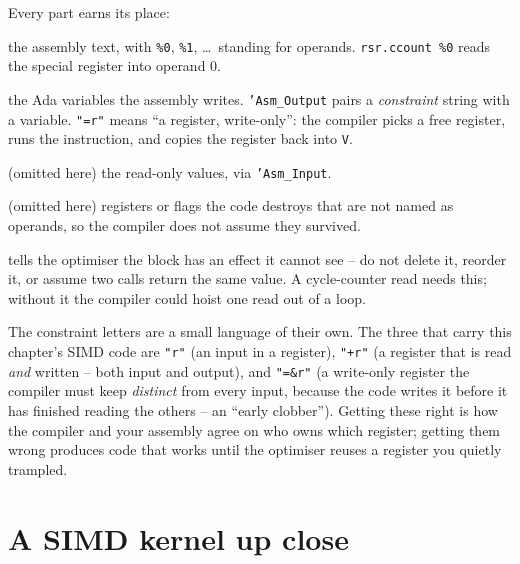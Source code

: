 Every part earns its place:

\begin{description}[style=nextline]
\item[Template] the assembly text, with \texttt{\%0}, \texttt{\%1}, \ldots\ standing
  for operands. \texttt{rsr.ccount \%0} reads the special register into operand 0.
\item[Outputs] the Ada variables the assembly writes. \texttt{'Asm\_Output} pairs a
  \emph{constraint} string with a variable. \texttt{"=r"} means ``a register,
  write-only'': the compiler picks a free register, runs the instruction, and copies
  the register back into \texttt{V}.
\item[Inputs] (omitted here) the read-only values, via \texttt{'Asm\_Input}.
\item[Clobber] (omitted here) registers or flags the code destroys that are not
  named as operands, so the compiler does not assume they survived.
\item[Volatile] tells the optimiser the block has an effect it cannot see -- do not
  delete it, reorder it, or assume two calls return the same value. A cycle-counter
  read needs this; without it the compiler could hoist one read out of a loop.
\end{description}

The constraint letters are a small language of their own. The three that carry this
chapter's SIMD code are \texttt{"r"} (an input in a register), \texttt{"+r"} (a
register that is read \emph{and} written -- both input and output), and
\texttt{"=\&r"} (a write-only register the compiler must keep \emph{distinct} from
every input, because the code writes it before it has finished reading the others --
an ``early clobber''). Getting these right is how the compiler and your assembly
agree on who owns which register; getting them wrong produces code that works until
the optimiser reuses a register you quietly trampled.


\section{A SIMD kernel up close}

